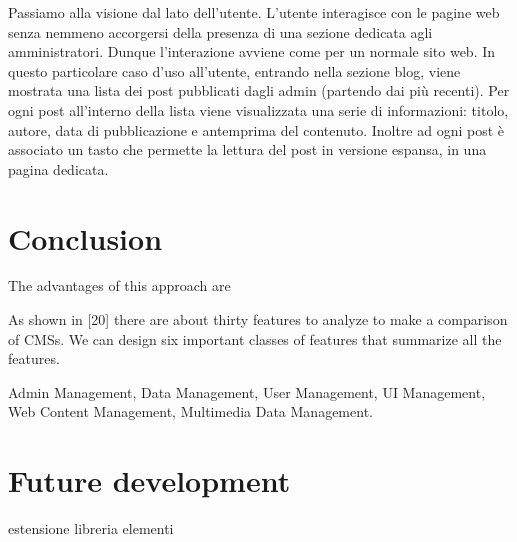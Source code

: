 \documentclass{sig-alternate}
\begin{document}
Passiamo alla visione dal lato dell'utente. 
L'utente interagisce con le pagine web senza nemmeno accorgersi della presenza di una sezione dedicata agli amministratori. Dunque l'interazione avviene come per un normale sito web. In questo particolare caso d'uso all'utente, entrando nella sezione blog, viene mostrata una lista dei post pubblicati dagli admin (partendo dai pi\`u recenti). Per ogni post all'interno della lista viene visualizzata una serie di informazioni: titolo, autore, data di pubblicazione e antemprima del contenuto. Inoltre ad ogni post \`e associato un tasto che permette la lettura del post in versione espansa, in una pagina dedicata.
\section{Conclusion}

The advantages of this approach are
 
As shown in [20] there are about thirty features to analyze to make a comparison of CMSs. We can design six important classes of features that summarize all the features.

Admin Management, Data Management, User Management, UI Management, Web Content Management, Multimedia Data Management.




\section{Future development}

estensione libreria elementi




%

%
%
\end{document}
